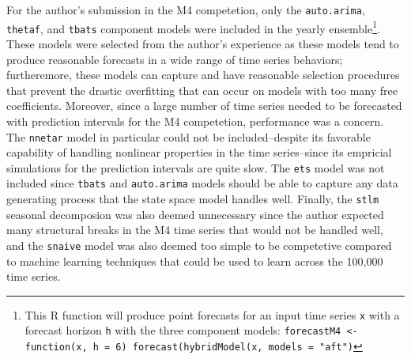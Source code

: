 \documentclass[11pt,3p,review,authoryear]{elsarticle}
\begin{document}
For the author's submission in the M4 competetion, only the \texttt{auto.arima}, \texttt{thetaf}, and \texttt{tbats} component models were included in the yearly ensemble\footnote{This R function will produce point forecasts for an input time series \texttt{x} with a forecast horizon \texttt{h} with the three component models: \texttt{forecastM4 <- function(x, h = 6) forecast(hybridModel(x, models = "aft")}}. These models were selected from the author's experience as these models tend to produce reasonable forecasts in a wide range of time series behaviors; furtheremore, these models can capture and have reasonable selection procedures that prevent the drastic overfitting that can occur on models with too many free coefficients. Moreover, since a large number of time series needed to be forecasted with prediction intervals for the M4 competetion, performance was a concern. The \texttt{nnetar} model in particular could not be included--despite its favorable capability of handling nonlinear properties in the time series--since its empricial simulations for the prediction intervals are quite slow. The \texttt{ets} model was not included since \texttt{tbats} and \texttt{auto.arima} models should be able to capture any data generating process that the state space model handles well. Finally, the \texttt{stlm} seasonal decomposion was also deemed unnecessary since the author expected many structural breaks in the M4 time series that would not be handled well, and the \texttt{snaive} model was also deemed too simple to be competetive compared to machine learning techniques that could be used to learn across the 100,000 time series.
\end{document}
